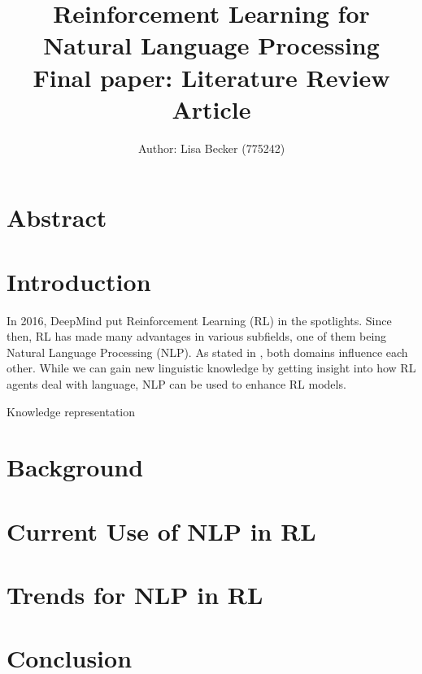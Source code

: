 \documentclass[11pt,a4paper]{article}
\title{{\LARGE Reinforcement Learning for Natural Language Processing}\\[1.5mm]
{\large Final paper: Literature Review Article}\\[1.5mm]} %
\author{Author: Lisa Becker (775242) } %
\begin{document}
\maketitle
\section{Abstract}


\section{Introduction}
In 2016, DeepMind put Reinforcement Learning (RL) in the spotlights. Since then, RL has made many advantages in various subfields, one of them being Natural Language Processing (NLP). As stated in \citet{ijcai2019}, both domains influence each other. While we can gain new linguistic knowledge by getting insight into how RL agents deal with language, NLP can be used to enhance RL models. 

Knowledge representation

\section{Background}

\section{Current Use of NLP in RL}

\section{Trends for NLP in RL}

\section{Conclusion}

\newpage

\end{document}
